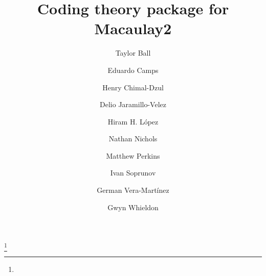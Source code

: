\documentclass[12pt]{amsart}
\theoremstyle{plain}
\begin{document}
\title{Coding theory package for Macaulay2}
\author{Taylor Ball}
\address[Taylor Ball]{Department of Mathematics\\University of Notre Dame\\ Notre Dame, IN USA}
\author{Eduardo Camps}
\address[Eduardo Camps]{Escuela Superior de F\'isica y Matem\'aticas \\ Instituto Polit\'ecnico Nacional\\ Mexico City, Mexico}
\author{Henry Chimal-Dzul}
\address[Henry Chimal-Dzul]{Department of Mathematics and Center of Ring Theory and its Applications\\ Ohio University\\ Athens, OH USA}
\author{Delio Jaramillo-Velez}
\address[Delio Jaramillo-Velez]{
Departamento de
Matem\'aticas\\
Centro de Investigaci\'on y de Estudios
Avanzados del
IPN\\
Apartado Postal
14--740 \\
07000 Mexico City, D.F.
}

\author{Hiram H. L\'opez}
\address[Hiram H. L\'opez]{Department of Mathematics and Statistics\\ Cleveland State University\\ Cleveland, OH USA}
\thanks{}
\author{Nathan Nichols}
\address[Nathan Nichols]{School of Mathematics \\ University of Minnesota Twin Cities \\ Minneapolis, MN USA}
\author{Matthew Perkins}
\address[Matthew Perkins]{Department of Mathematics\\ Cleveland State University\\ Cleveland, OH USA}
\author{Ivan Soprunov}
\address[Ivan Soprunov]{Department of Mathematics\\ Cleveland State University\\ Cleveland, OH USA}
\author{German Vera-Mart\'inez}
\address[German Vera-Mart\'inez]{Escuela Superior de F\'isica y Matem\'aticas \\ Instituto Polit\'ecnico Nacional\\ Mexico City, Mexico}
\author{Gwyn Whieldon}
\address[Gwyn Whieldon]{}
\end{document}
